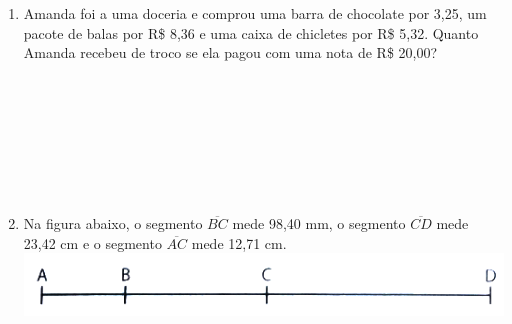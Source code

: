 \documentclass[a4paper,14pt]{article}
\begin{document}
\begin{multicols}{2}
\begin{enumerate}
    			O acesso aos elevadores tem os seguintes custos:
    			\noindent\begin{itemize}
    				\item Subir pelo elevador 1: \\ R\$ 0,15.
    				\item Subir pelo elevador 2: \\ R\$ 1,80.
    				\item Descer pelo elevador 1: \\ R\$ 0,10.
    				\item Descer pelo elevador 2: \\ R\$ 2,30. \\
    			\end{itemize}
    			O custo da passagem do teleférico partindo do topo do mirante 1 para o mirante 2 é de R\$ 2,00, e do topo do mirante 2 para o topo do mirante 1 é de R\$ 2,50. \\
    			Qual é o menor custo, em real, para uma pessoa visitar os topos do dois mirantes e retornar ao solo?
    			\begin{enumerate}[a)]
    				\item 2,25
    				\item 3,90
    				\item 4,35
    				\item 4,40
    				\item 4,45 \\\\
    			\end{enumerate}
    			\item Amanda foi a uma doceria e comprou uma barra de chocolate por 3,25, um pacote de balas por R\$ 8,36 e uma caixa de chicletes por R\$ 5,32. Quanto Amanda recebeu de troco se ela pagou com uma nota de R\$ 20,00? \\\\\\\\\\\\\\\\
    			\item Na figura abaixo, o segmento $\overline{BC}$ mede 98,40 mm, o segmento $\overline{CD}$ mede 23,42 cm e o segmento $\overline{AC}$ mede 12,71 cm. \\
    			\includegraphics[width=1\linewidth]{6FMA56_imagens/imagem4} \\

\end{enumerate}
\end{multicols}
\end{document}
